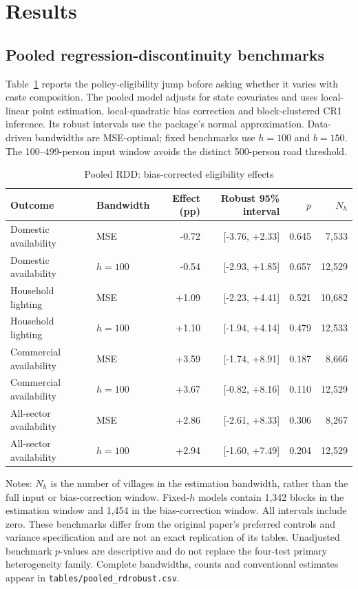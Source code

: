 \documentclass[11pt,a4paper]{article}
\begin{document}
\section{Results}
\subsection{Pooled regression-discontinuity benchmarks}
Table~\ref{tab:pooled} reports the policy-eligibility jump before asking whether it varies with caste composition. The pooled model adjusts for state covariates and uses local-linear point estimation, local-quadratic bias correction and block-clustered CR1 inference. Its robust intervals use the package's normal approximation. Data-driven bandwidths are MSE-optimal; fixed benchmarks use $h=100$ and $b=150$. The 100--499-person input window avoids the distinct 500-person road threshold.

\begin{table}[htbp]\centering\footnotesize
\setlength{\tabcolsep}{4pt}
\caption{Pooled RDD: bias-corrected eligibility effects}
\label{tab:pooled}
\begin{tabular}{@{}llrrrr@{}}\toprule
Outcome & Bandwidth & Effect (pp) & Robust 95\% interval & $p$ & $N_h$\\\midrule
Domestic availability & MSE & -0.72 & [-3.76, +2.33] & 0.645 & 7,533 \\
Domestic availability & $h=100$ & -0.54 & [-2.93, +1.85] & 0.657 & 12,529 \\
Household lighting & MSE & +1.09 & [-2.23, +4.41] & 0.521 & 10,682 \\
Household lighting & $h=100$ & +1.10 & [-1.94, +4.14] & 0.479 & 12,533 \\
Commercial availability & MSE & +3.59 & [-1.74, +8.91] & 0.187 & 8,666 \\
Commercial availability & $h=100$ & +3.67 & [-0.82, +8.16] & 0.110 & 12,529 \\
All-sector availability & MSE & +2.86 & [-2.61, +8.33] & 0.306 & 8,267 \\
All-sector availability & $h=100$ & +2.94 & [-1.60, +7.49] & 0.204 & 12,529 \\
\bottomrule\end{tabular}
\par\smallskip\raggedright
Notes: $N_h$ is the number of villages in the estimation bandwidth, rather than the full input or bias-correction window. Fixed-$h$ models contain 1,342 blocks in the estimation window and 1,454 in the bias-correction window. All intervals include zero. These benchmarks differ from the original paper's preferred controls and variance specification and are not an exact replication of its tables. Unadjusted benchmark $p$-values are descriptive and do not replace the four-test primary heterogeneity family. Complete bandwidths, counts and conventional estimates appear in \nolinkurl{tables/pooled_rdrobust.csv}.
\end{table}
\FloatBarrier
\end{document}
